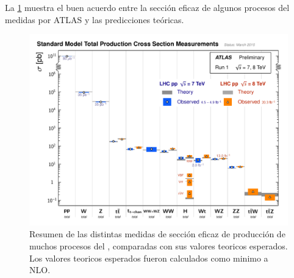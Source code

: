 La {\fig} \ref{fig:sm_atlas_xs} muestra el buen acuerdo entre la sección eficaz de algunos
procesos del {\SM} medidas por ATLAS y las predicciones
teóricas.

\begin{figure}[h]
  \centering
  \includegraphics[width=1\textwidth]{figures/ATLAS_a_SMSummary_TotalXsect.pdf}
  \caption{Resumen de las distintas medidas de secci\'on eficaz de producci\'on de muchos
    procesos del {\SM}, comparadas con sus valores teoricos esperados.
    Los valores teoricos esperados fueron calculados como minimo a NLO.
  }\label{fig:sm_atlas_xs}
\end{figure}


